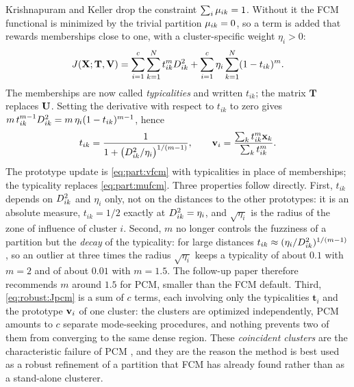 Krishnapuram and Keller \cite{krishnapuram:1993:pcm} drop the constraint $\sum_i\mu_{ik}=1$. Without it the FCM functional is minimized by the trivial partition $\mu_{ik}=0$, so a term is added that rewards memberships close to one, with a cluster-specific weight $\eta_i>0$:
\begin{equation}
  J(\mathbf{X};\mathbf{T},\mathbf{V})=\sum_{i=1}^{c}\sum_{k=1}^{N}t_{ik}^mD^2_{ik}+\sum_{i=1}^{c}\eta_i\sum_{k=1}^{N}(1-t_{ik})^m .
  \label{eq:robust:Jpcm}
\end{equation}
The memberships are now called \emph{typicalities} and written $t_{ik}$; the matrix $\mathbf{T}$ replaces $\mathbf{U}$. Setting the derivative with respect to $t_{ik}$ to zero gives $m\,t_{ik}^{m-1}D^2_{ik}=m\,\eta_i(1-t_{ik})^{m-1}$, hence
\begin{equation}
  t_{ik}=\frac{1}{1+\big(D^2_{ik}/\eta_i\big)^{1/(m-1)}},\qquad
  \mathbf{v}_i=\frac{\sum_k t_{ik}^m\mathbf{x}_k}{\sum_k t_{ik}^m}.
  \label{eq:robust:pcm}
\end{equation}
The prototype update is \eqref{eq:part:vfcm} with typicalities in place of memberships; the typicality replaces \eqref{eq:part:mufcm}. Three properties follow directly. First, $t_{ik}$ depends on $D^2_{ik}$ and $\eta_i$ only, not on the distances to the other prototypes: it is an absolute measure, $t_{ik}=1/2$ exactly at $D^2_{ik}=\eta_i$, and $\sqrt{\eta_i}$ is the radius of the zone of influence of cluster $i$. Second, $m$ no longer controls the fuzziness of a partition but the \emph{decay} of the typicality: for large distances $t_{ik}\approx(\eta_i/D^2_{ik})^{1/(m-1)}$, so an outlier at three times the radius $\sqrt{\eta_i}$ keeps a typicality of about $0.1$ with $m=2$ and of about $0.01$ with $m=1.5$. The follow-up paper \cite{krishnapuram:1996:pcm} therefore recommends $m$ around $1.5$ for PCM, smaller than the FCM default. Third, \eqref{eq:robust:Jpcm} is a sum of $c$ terms, each involving only the typicalities $\mathbf{t}_i$ and the prototype $\mathbf{v}_i$ of one cluster: the clusters are optimized independently, PCM amounts to $c$ separate mode-seeking procedures, and nothing prevents two of them from converging to the same dense region. These \emph{coincident clusters} are the characteristic failure of PCM \cite{krishnapuram:1996:pcm}, and they are the reason the method is best used as a robust refinement of a partition that FCM has already found rather than as a stand-alone clusterer.

